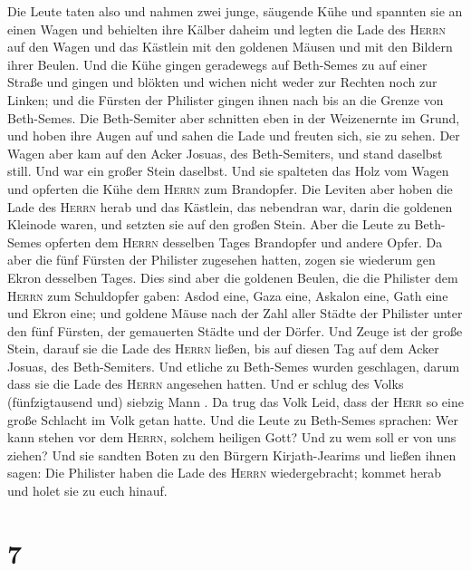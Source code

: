  Die Leute taten also und nahmen zwei junge, säugende
Kühe und spannten sie an einen Wagen und behielten ihre Kälber daheim
 und legten die Lade des \textsc{Herrn} auf den Wagen und
das Kästlein mit den goldenen Mäusen und mit den Bildern ihrer Beulen.
 Und die Kühe gingen geradewegs auf Beth-Semes zu auf
einer Straße und gingen und blökten und wichen nicht weder zur Rechten
noch zur Linken; und die Fürsten der Philister gingen ihnen nach bis an
die Grenze von Beth-Semes.  Die Beth-Semiter aber
schnitten eben in der Weizenernte im Grund, und hoben ihre Augen auf und
sahen die Lade und freuten sich, sie zu sehen.  Der Wagen
aber kam auf den Acker Josuas, des Beth-Semiters, und stand daselbst
still. Und war ein großer Stein daselbst. Und sie spalteten das Holz vom
Wagen und opferten die Kühe dem \textsc{Herrn} zum Brandopfer.
 Die Leviten aber hoben die Lade des \textsc{Herrn} herab
und das Kästlein, das nebendran war, darin die goldenen Kleinode waren,
und setzten sie auf den großen Stein. Aber die Leute zu Beth-Semes
opferten dem \textsc{Herrn} desselben Tages Brandopfer und andere Opfer.
 Da aber die fünf Fürsten der Philister zugesehen hatten,
zogen sie wiederum gen Ekron desselben Tages.  Dies sind
aber die goldenen Beulen, die die Philister dem \textsc{Herrn} zum
Schuldopfer gaben: Asdod eine, Gaza eine, Askalon eine, Gath eine und
Ekron eine;  und goldene Mäuse nach der Zahl aller Städte
der Philister unter den fünf Fürsten, der gemauerten Städte und der
Dörfer. Und Zeuge ist der große Stein, darauf sie die Lade des
\textsc{Herrn} ließen, bis auf diesen Tag auf dem Acker Josuas, des
Beth-Semiters.  Und etliche zu Beth-Semes wurden
geschlagen, darum dass sie die Lade des \textsc{Herrn} angesehen hatten.
Und er schlug des Volks (fünfzigtausend und) siebzig Mann . Da trug das
Volk Leid, dass der \textsc{Herr} so eine große Schlacht im Volk getan
hatte.  Und die Leute zu Beth-Semes sprachen: Wer kann
stehen vor dem \textsc{Herrn}, solchem heiligen Gott? Und zu wem soll er
von uns ziehen?  Und sie sandten Boten zu den Bürgern
Kirjath-Jearims und ließen ihnen sagen: Die Philister haben die Lade des
\textsc{Herrn} wiedergebracht; kommet herab und holet sie zu euch
hinauf.

\hypertarget{section-6}{%
\section{7}\label{section-6}}

